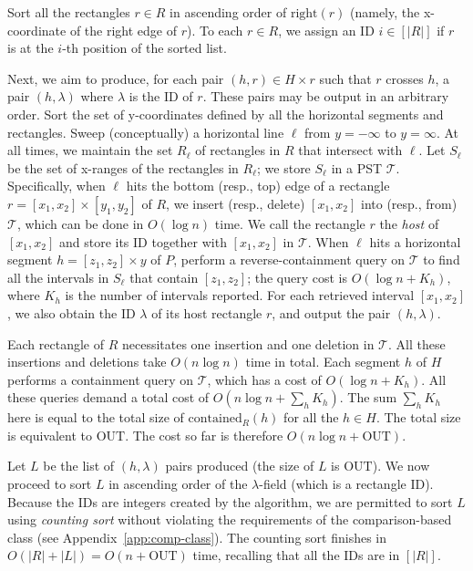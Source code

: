 \documentclass[acmsmall,review,anonymous]{acmart}
\def\vgap{\vspace{1mm}}
\def\extraspacing{\vspace{2mm} \noindent}
\def\T{\mathcal{T}}
\def\xright{\mathrm{right}}
\def\contained{\mathrm{contained}}
\def\out{\mathrm{OUT}}
\begin{document}
{{{\extraspacing {\bf Algorithm for Problem $\bm{\mathscr{E}}$.} Sort all the rectangles $r \in R$ in ascending order of $\xright(r)$ (namely, the x-coordinate of the right edge of $r$). To each $r \in R$, we assign an ID $i \in [|R|]$ if $r$ is at the $i$-th position of the sorted list.


\vgap

Next, we aim to produce, for each pair $(h, r) \in H \times r$ such that $r$ crosses $h$, a pair $(h, \lambda)$ where $\lambda$ is the ID of $r$. These pairs may be output in an arbitrary order. Sort the set of y-coordinates defined by all the horizontal segments and rectangles. Sweep (conceptually) a horizontal line $\ell$ from $y = -\infty$ to $y = \infty$. At all times, we maintain the set $R_\ell$ of rectangles in $R$ that intersect with $\ell$. Let $S_\ell$ be the set of x-ranges of the rectangles in $R_\ell$; we store $S_\ell$ in a PST $\T$. Specifically, when $\ell$ hits the bottom (resp., top) edge of a rectangle $r = [x_1, x_2] \times [y_1, y_2]$ of $R$, we insert (resp., delete) $[x_1, x_2]$ into (resp., from) $\T$, which can be done in $O(\log n)$ time. We call the rectangle $r$ the {\em host} of $[x_1, x_2]$ and store its ID together with $[x_1, x_2]$ in $\T$. When $\ell$ hits a horizontal segment $h = [z_1, z_2] \times y$ of $P$, perform a reverse-containment query on $\T$ to find all the intervals in $S_\ell$ that contain $[z_1, z_2]$; the query cost is $O(\log n + K_h)$, where $K_h$ is the number of intervals reported. For each retrieved interval $[x_1, x_2]$, we also obtain the ID $\lambda$ of its host rectangle $r$, and output the pair $(h, \lambda)$.

\vgap

Each rectangle of $R$ necessitates one insertion and one deletion in $\T$. All these insertions and deletions take $O(n \log n)$ time in total. Each segment $h$ of $H$ performs a containment query on $\T$, which has a cost of $O(\log n + K_h)$. All these queries demand a total cost of $O(n \log n + \sum_h K_h)$. The sum $\sum_h K_h$ here is equal to the total size of $\contained_R(h)$ for all the $h \in H$. The total size is equivalent to $\out$. The cost so far is therefore $O(n \log n + \out)$.

\vgap

Let $L$ be the list of $(h, \lambda)$ pairs produced (the size of $L$ is $\out$). We now proceed to sort $L$ in ascending order of the $\lambda$-field (which is a rectangle ID). Because the IDs are integers created by the algorithm, we are permitted to sort $L$ using {\em counting sort} without violating the requirements of the comparison-based class (see Appendix~\ref{app:comp-class}). The counting sort finishes in $O(|R| + |L|) = O(n + \out)$ time, recalling that all the IDs are in $[|R|]$.

}}}
\end{document}
